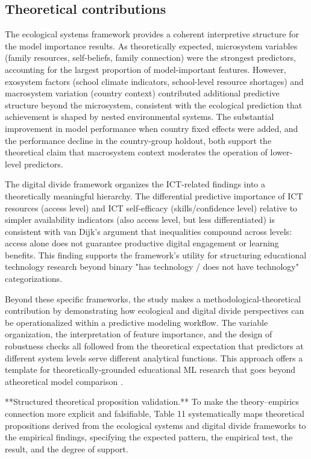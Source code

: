 \documentclass[pdflatex,sn-mathphys-ay]{sn-jnl}
\begin{document}
\subsection{Theoretical contributions}

The ecological systems framework \citep{Bronfenbrenner_1979,Bronfenbrenner_1994} provides a coherent interpretive structure for the model importance results. As theoretically expected, microsystem variables (family resources, self-beliefs, family connection) were the strongest predictors, accounting for the largest proportion of model-important features. However, exosystem factors (school climate indicators, school-level resource shortages) and macrosystem variation (country context) contributed additional predictive structure beyond the microsystem, consistent with the ecological prediction that achievement is shaped by nested environmental systems. The substantial improvement in model performance when country fixed effects were added, and the performance decline in the country-group holdout, both support the theoretical claim that macrosystem context moderates the operation of lower-level predictors.

The digital divide framework \citep{van_Dijk_2005,van_Dijk_2020} organizes the ICT-related findings into a theoretically meaningful hierarchy. The differential predictive importance of ICT resources (access level) and ICT self-efficacy (skills/confidence level) relative to simpler availability indicators (also access level, but less differentiated) is consistent with van Dijk's argument that inequalities compound across levels: access alone does not guarantee productive digital engagement or learning benefits. This finding supports the framework's utility for structuring educational technology research beyond binary "has technology / does not have technology" categorizations.

Beyond these specific frameworks, the study makes a methodological-theoretical contribution by demonstrating how ecological and digital divide perspectives can be operationalized within a predictive modeling workflow. The variable organization, the interpretation of feature importance, and the design of robustness checks all followed from the theoretical expectation that predictors at different system levels serve different analytical functions. This approach offers a template for theoretically-grounded educational ML research that goes beyond atheoretical model comparison \citep{Ersozlu_2024}.

**Structured theoretical proposition validation.** To make the theory--empirics connection more explicit and falsifiable, Table 11 systematically maps theoretical propositions derived from the ecological systems and digital divide frameworks to the empirical findings, specifying the expected pattern, the empirical test, the result, and the degree of support.
\end{document}
